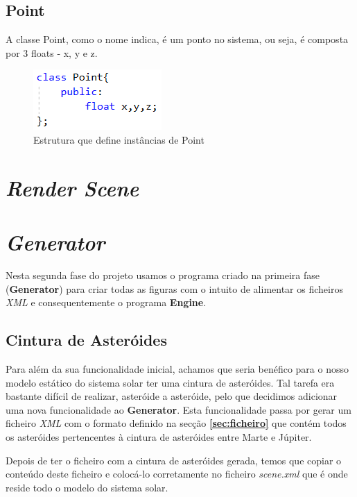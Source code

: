 \documentclass[a4paper]{article}
\begin{document}
\subsection{Point}
\label{sec:point}

A classe Point, como o nome indica, é um ponto no sistema, ou seja, é composta por 3 floats - x, y e z.

\begin{figure}[H]
\centering
\includegraphics[scale=0.8]{point.png}
\caption{Estrutura que define instâncias de Point}
\label{img:Point}
\end{figure}


\newpage

\section{\textit{Render Scene}}

\newpage

\section{\textit{Generator}}

Nesta segunda fase do projeto usamos o programa criado na primeira fase (\textbf{Generator}) para criar todas as figuras com o intuito de alimentar os ficheiros \emph{XML} e consequentemente o programa \textbf{Engine}.

\subsection{Cintura de Asteróides}

Para além da sua funcionalidade inicial, achamos que seria benéfico para o nosso modelo estático do sistema solar ter uma cintura de asteróides. Tal tarefa era bastante difícil de realizar, asteróide a asteróide, pelo que decidimos adicionar uma nova funcionalidade ao \textbf{Generator}. Esta funcionalidade passa por gerar um ficheiro \emph{XML} com o formato definido na secção \textbf{\ref{sec:ficheiro}} que contém todos os asteróides pertencentes à cintura de asteróides entre Marte e Júpiter.

Depois de ter o ficheiro com a cintura de asteróides gerada, temos que copiar o conteúdo deste ficheiro e colocá-lo corretamente no ficheiro \emph{scene.xml} que é onde reside todo o modelo do sistema solar.
\end{document}

